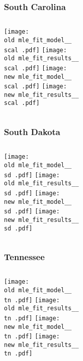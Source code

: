 \documentclass{beamer}
\newcommand{\old}{api-370-prod/pyseir/state_summaries/reports/}
\newcommand{\new}{new/pyseir/state_summaries/reports/}
\newcommand{\scal}{South Carolina__45}
\newcommand{\sd}{South Dakota__46}
\newcommand{\tn}{Tennessee__47}
\begin{document}
\begin{frame}
\frametitle{South Carolina}
    \begin{columns}[t]
       \texttt{[image: \\old mle\_fit\_model\_\_\\scal .pdf]}
       \texttt{[image: \\old mle\_fit\_results\_\_\\scal .pdf]}   
       \texttt{[image: \\new mle\_fit\_model\_\_\\scal .pdf]}
       \texttt{[image: \\new mle\_fit\_results\_\_\\scal .pdf]}   
\end{columns}
\end{frame}


\begin{frame}
\frametitle{South Dakota}
    \begin{columns}[t]
       \texttt{[image: \\old mle\_fit\_model\_\_\\sd .pdf]}
       \texttt{[image: \\old mle\_fit\_results\_\_\\sd .pdf]}   
       \texttt{[image: \\new mle\_fit\_model\_\_\\sd .pdf]}
       \texttt{[image: \\new mle\_fit\_results\_\_\\sd .pdf]}   
\end{columns}
\end{frame}

\begin{frame}
\frametitle{Tennessee}
    \begin{columns}[t]
       \texttt{[image: \\old mle\_fit\_model\_\_\\tn .pdf]}
       \texttt{[image: \\old mle\_fit\_results\_\_\\tn .pdf]}   
       \texttt{[image: \\new mle\_fit\_model\_\_\\tn .pdf]}
       \texttt{[image: \\new mle\_fit\_results\_\_\\tn .pdf]}   
\end{columns}
\end{frame}
\end{document}
